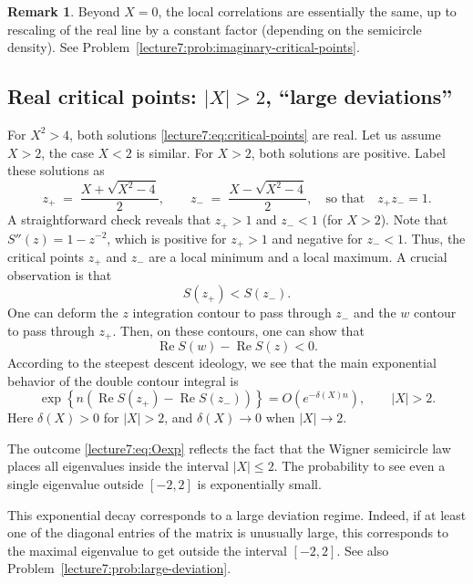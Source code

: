 \documentclass[letterpaper,11pt,oneside,reqno]{book}
\numberwithin{equation}{chapter}  %
\theoremstyle{definition}
\newtheorem{remark}[proposition]{Remark}
\begin{document}
\begin{remark}
	Beyond $X=0$, the local correlations are essentially the same,
	up to rescaling of the real line by a constant factor (depending
	on the semicircle density).
	See Problem~\ref{lecture7:prob:imaginary-critical-points}.
\end{remark}

\subsection{Real critical points: $|X|>2$, ``large deviations''}
\label{lecture7:sub:real-critical-points}

For \(X^2>4\), both solutions
\eqref{lecture7:eq:critical-points}
are real. Let us assume $X>2$, the case \(X<2\) is similar.
For $X>2$, both solutions are positive.
Label these solutions as
\[
	z_+ \;=\;\frac{X + \sqrt{X^2-4}}{2},
	\qquad
	z_- \;=\;\frac{X - \sqrt{X^2-4}}{2},
	\quad
	\text{so that}\quad z_+z_-=1.
\]
A straightforward check reveals that \(z_+\!>\!1\) and \(z_-\!<\!1\) (for \(X>2\)).
Note that $S''(z)=1-z^{-2}$, which is positive for \(z_+>1\) and negative for \(z_-<1\).  Thus, the critical points \(z_+\) and \(z_-\) are a local minimum and a local maximum.
A crucial observation is that
\begin{equation*}
	S(z_+)<S(z_-).
\end{equation*}
One can deform the $z$ integration contour to pass through
$z_-$ and the $w$ contour to pass through $z_+$.
Then, on these contours, one can show that
\begin{equation*}
	\operatorname{Re}S(w)-\operatorname{Re}S(z)<0.
\end{equation*}
According to the steepest descent ideology,
we see that the main exponential behavior of the double contour integral is
\begin{equation}
	\label{lecture7:eq:Oexp}
	\exp\left\{ n\left(
		\operatorname{Re}S(z_+)-\operatorname{Re}S(z_-)
\right) \right\}=O( e^{-\delta(X)n} ), \qquad |X|>2.
\end{equation}
Here $\delta(X)>0$ for $|X|>2$, and $\delta(X)\to0$ when $|X|\to2$.

The outcome \eqref{lecture7:eq:Oexp} reflects the fact that the
Wigner semicircle law places all eigenvalues inside the
interval \(\lvert X\rvert \le 2\).
The probability to see even a single eigenvalue outside $[-2,2]$
is exponentially small.

This exponential decay corresponds to a large deviation regime.
Indeed, if at least one of the diagonal entries of the matrix
is unusually large, this corresponds to
the maximal eigenvalue to get outside the interval \([-2,2]\).
See also Problem~\ref{lecture7:prob:large-deviation}.
\end{document}
